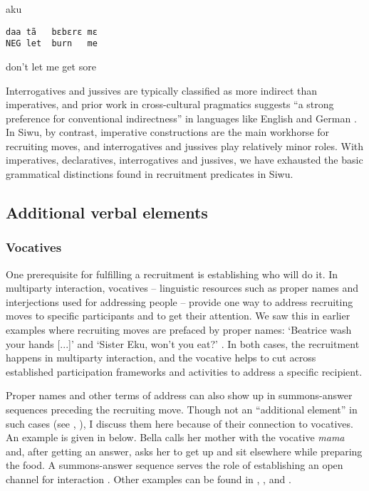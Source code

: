 \documentclass[output=paper]{langsci/langscibook}
\begin{document}
\vspace{2mm}
%
\begin{transbox}{1}{aku}
\begin{verbatim}
daa tã   bɛbɛrɛ mɛ
NEG let  burn   me
\end{verbatim}
don’t let me get sore
\end{transbox}\bigskip

\normalsize
Interrogatives and jussives are typically classified as more indirect than imperatives, and prior work in cross-cultural pragmatics suggests “a strong preference for conventional indirectness” in languages like English and German \citep{ogiermann_politeness_2009}. In Siwu, by contrast, imperative constructions are the main workhorse for recruiting moves, and interrogatives and jussives play relatively minor roles. With imperatives, declaratives, interrogatives and jussives, we have exhausted the basic grammatical distinctions found in recruitment predicates in Siwu.

\subsection{Additional verbal elements}

\subsubsection{Vocatives}
One prerequisite for fulfilling a recruitment is establishing who will do it. In multiparty interaction, vocatives -- linguistic resources such as proper names and interjections used for addressing people -- provide one way to address recruiting moves to specific participants and to get their attention. We saw this in earlier examples where recruiting moves are prefaced by proper names: ‘Beatrice wash your hands [...]’  and ‘Sister Eku, won’t you eat?’ . In both cases, the recruitment happens in multiparty interaction, and the vocative helps to cut across established participation frameworks and activities to address a specific recipient.

Proper names and other terms of address can also show up in summons-answer sequences preceding the recruiting move. Though not an “additional element” in such cases (see , ), I discuss them here because of their connection to vocatives. An example is given in  below. Bella calls her mother with the vocative \textit{mama} and, after getting an answer, asks her to get up and sit elsewhere while preparing the food. A summons-answer sequence serves the role of establishing an open channel for interaction \citep{Schegloff1968}. Other examples can be found in , , and .
\end{document}
